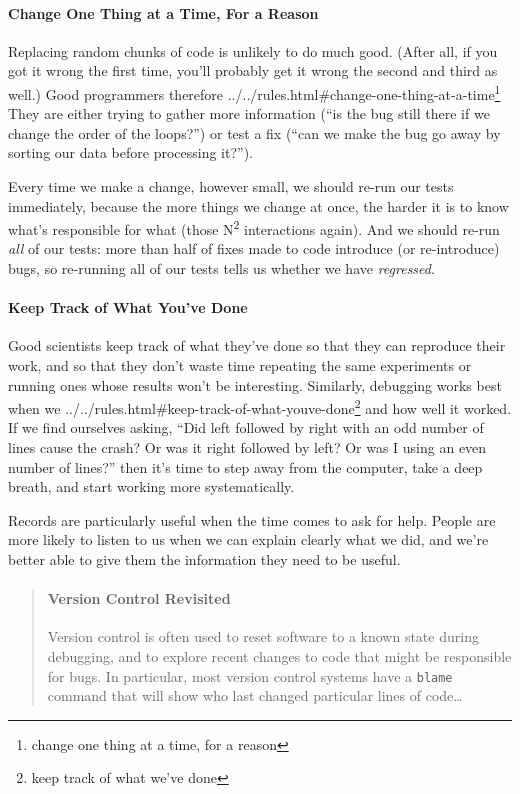 \documentclass[]{book}
\newcommand{\urlfoot}[2]{{#1}\footnote{#2}}
\newcommand{\gdef}[2]{\emph{#2}}
\begin{document}
\mbox{}\paragraph{Change One Thing at a Time, For a Reason}

Replacing random chunks of code is unlikely to do much good. (After all,
if you got it wrong the first time, you'll probably get it wrong the
second and third as well.) Good programmers therefore
\urlfoot{../../rules.html\#change-one-thing-at-a-time}{change one thing at
a time, for a reason} They are either trying to gather more information
(``is the bug still there if we change the order of the loops?'') or
test a fix (``can we make the bug go away by sorting our data before
processing it?'').

Every time we make a change, however small, we should re-run our tests
immediately, because the more things we change at once, the harder it is
to know what's responsible for what (those N\textsuperscript{2}
interactions again). And we should re-run \emph{all} of our tests: more
than half of fixes made to code introduce (or re-introduce) bugs, so
re-running all of our tests tells us whether we have
\gdef{g:regression}{regressed}.

\mbox{}\paragraph{Keep Track of What You've Done}

Good scientists keep track of what they've done so that they can
reproduce their work, and so that they don't waste time repeating the
same experiments or running ones whose results won't be interesting.
Similarly, debugging works best when we
\urlfoot{../../rules.html\#keep-track-of-what-youve-done}{keep track of
what we've done} and how well it worked. If we find ourselves asking,
``Did left followed by right with an odd number of lines cause the
crash? Or was it right followed by left? Or was I using an even number
of lines?'' then it's time to step away from the computer, take a deep
breath, and start working more systematically.

Records are particularly useful when the time comes to ask for help.
People are more likely to listen to us when we can explain clearly what
we did, and we're better able to give them the information they need to
be useful.

\begin{quote}
\mbox{}\paragraph{Version Control Revisited}

Version control is often used to reset software to a known state during
debugging, and to explore recent changes to code that might be
responsible for bugs. In particular, most version control systems have a
\texttt{blame} command that will show who last changed particular lines
of code\ldots{}
\end{quote}
\end{document}
